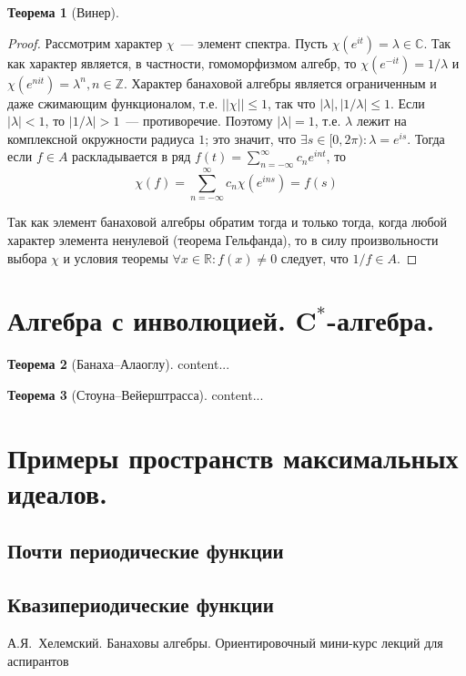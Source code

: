 \documentclass[12pt]{extarticle}
\theoremstyle{definition}
\newtheorem{theorem}{\indent Теорема}[section]
\begin{document}
\begin{theorem}[Винер]
\begin{proof}
		Рассмотрим характер $\chi$~--- элемент спектра. Пусть $\chi(e^{it})=\lambda\in\mathbb{C}$. Так как характер является, в частности, гомоморфизмом алгебр, то $\chi(e^{-it})=1/\lambda$ и $\chi(e^{nit})=\lambda^n,n\in\mathbb{Z}$. Характер банаховой алгебры является ограниченным и даже сжимающим функционалом, т.е. $||\chi||\leq 1$, так что $|\lambda|, |1/\lambda|\leq 1$. Если $|\lambda|<1$, то $|1/\lambda|>1$~--- противоречие. Поэтому $|\lambda|=1$, т.е. $\lambda$ лежит на комплексной окружности радиуса $1$; это значит, что $\exists s\in [0,2\pi)\colon \lambda=e^{is}$. Тогда если $f\in A$ раскладывается в ряд $f(t)=\sum_{n=-\infty}^{\infty} c_n e^{int}$, то
		$$\chi(f)=\sum_{n=-\infty}^{\infty} c_n \chi (e^{ins})=f(s)$$

		Так как элемент банаховой алгебры обратим тогда и только тогда, когда любой характер элемента ненулевой (теорема Гельфанда), то в силу произвольности выбора $\chi$ и условия теоремы $\forall x\in\mathbb{R}\colon  f(x)\neq 0$ следует, что $1/f\in A$.
    \end{proof}
        \end{theorem}

    \section{Алгебра с инволюцией. \texorpdfstring{$\symbf{C^*}$}{C*}-алгебра.}
        \begin{theorem}[Банаха--Алаоглу]\label{th:Alaoglu}
            content...
        \end{theorem}
        \begin{theorem}[Стоуна--Вейерштрасса]\label{th:StoneWrstrs}
            content...
        \end{theorem}

    \section[Примеры пространств максимальных идеалов]{Примеры пространств максимальных идеалов.}
        \subsection{Почти периодические функции}
        \subsection{Квазипериодические функции}
    \newpage
    \begin{thebibliography}{10}
        А.Я.~Хелемский. Банаховы алгебры. Ориентировочный мини-курс лекций для аспирантов
    \end{thebibliography}
\end{document}
